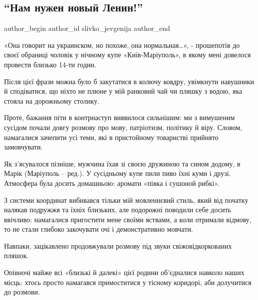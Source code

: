  
 
 
 
 
\subsection{\enquote{Нам нужен новый Ленин!}}
\label{sec:15_12_2021.stz.news.ua.den.1.nuzhen_lenin}


\ifcmt
 author_begin
   author_id slivko_jevgenija
 author_end
\fi

«Она говорит на украинском, но похоже, она  нормальная…», - прошепотів до своєї
обраниці чоловік у нічному купе «Київ-Маріуполь», в якому мені довелося
провести близько 14-ти годин.

Після цієї фрази можна було б закутатися в колючу ковдру, увімкнути навушники й
сподіватися, що ніхто не плюне у мій ранковий чай чи пляшку з водою, яка стояла
на дорожньому столику.

Проте, бажання піти в контрнаступ виявилося сильнішим: ми з вимушеним сусідом
почали довгу розмову про мову, патріотизм, політику й віру. Словом, намагалися
зачепити усі теми, які в пристойному товаристві прийнято замовчувати.

Як з'ясувалося пізніше, мужчина їхав зі своєю дружиною та сином додому, в Марік
(Маріуполь – ред.). У сусідньому купе пили пиво їхні куми і друзі. Атмосфера
була досить домашньою: аромати «півка і сушоной рибкі».

З системи координат вибивався тільки мій мовленнєвий стиль, який від початку
налякав подружжя та їхніх близьких, але подорожні поводили себе досить
ввічливо: намагалися пригостити мене своїми яствами, а коли отримали відмову,
то не стали глибоко закочувати очі і демонстративно мовчати.

Навпаки, зацікавлено продовжували розмову під звуки свіжовідкоркованих пляшок.

Опівночі  майже всі «близькі й далекі» цієї родини об'єдналися навколо наших
місць: хтось просто намагався примоститися у тісному коридорі, аби долучитися
до розмови.

